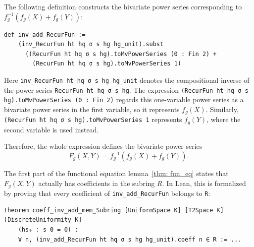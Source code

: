 




The following definition constructs the bivariate power series
corresponding to $f_g^{-1}(f_g(X) + f_g(Y))$:
\begin{lstlisting}
def inv_add_RecurFun :=
    (inv_RecurFun ht hq σ s hg hg_unit).subst
      ((RecurFun ht hq σ s hg).toMvPowerSeries (0 : Fin 2) +
        (RecurFun ht hq σ s hg).toMvPowerSeries 1)
\end{lstlisting}

Here \lstinline|inv_RecurFun ht hq σ s hg hg_unit| denotes the
compositional inverse of the power series \lstinline|RecurFun ht hq σ s hg|.
The expression
\lstinline|(RecurFun ht hq σ s hg).toMvPowerSeries (0 : Fin 2)|
regards this one-variable power series as a bivariate power series in the
first variable, so it represents $f_g(X)$.  Similarly,
\lstinline|(RecurFun ht hq σ s hg).toMvPowerSeries 1| represents
$f_g(Y)$, where the second variable is used instead.

Therefore, the whole expression defines the bivariate power series
\[
  F_g(X,Y) = f_g^{-1}(f_g(X) + f_g(Y)).
\]

The first part of the functional equation lemma~\ref{thm: fun_eq}
states that $F_g(X,Y)$ actually has coefficients in the subring $R$.
In Lean, this is
formalized by proving that every coefficient of
\lstinline|inv_add_RecurFun| belongs to \lstinline|R|:
\begin{lstlisting}
theorem coeff_inv_add_mem_Subring [UniformSpace K] [T2Space K] [DiscreteUniformity K]
    (hs₀ : s 0 = 0) :
    ∀ n, (inv_add_RecurFun ht hq σ s hg hg_unit).coeff n ∈ R := ...
\end{lstlisting}

